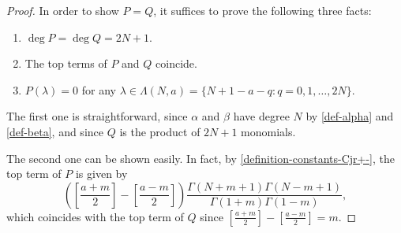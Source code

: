 \documentclass[12pt, pdflatex, a4paper]{article}
\theoremstyle{plain}
\theoremstyle{definition}
\begin{document}
\begin{proof}
In order to show $P = Q$, it suffices to prove the following three facts:
\begin{enumerate}[label=\normalfont{(\arabic*)}]
\item $\deg P = \deg Q = 2N+1$.
\item The top terms of $P$ and $Q$ coincide.
\item $P(\lambda) = 0$ for any $\lambda \in \Lambda(N,a) = \{N+1-a-q: q=0, 1, \ldots, 2N\}$. 
\end{enumerate}
The first one is straightforward, since $\alpha$ and $\beta$ have degree $N$ by \eqref{def-alpha} and \eqref{def-beta}, and since $Q$ is the product of $2N+1$ monomials.

The second one can be shown easily. In fact, by \eqref{definition-constants-Cjr+-}, the top term of $P$ is given by
\begin{equation*}
\left(\left[\frac{a+m}{2}\right]-\left[\frac{a-m}{2}\right]\right)\frac{\Gamma(N+m+1)\Gamma(N-m+1)}{\Gamma(1+m)\Gamma(1-m)},
\end{equation*}
which coincides with the top term of $Q$ since $\left[\frac{a+m}{2}\right]-\left[\frac{a-m}{2}\right] = m$.


\end{proof}
\end{document}

